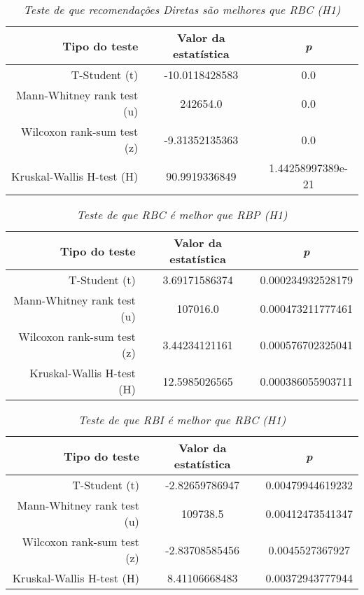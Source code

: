\begin{table}
\centering
\begin{tabular}{|r|c|c|}
    \hline
    \textbf{Tipo do teste} & \textbf{Valor da estatística} & \textbf{\textit{p}} \\
    \hline
T-Student (t) & -10.0118428583 & 0.0 \\
\hline 
Mann-Whitney rank test (u) & 242654.0 & 0.0 \\
\hline 
Wilcoxon rank-sum test (z) & -9.31352135363 & 0.0 \\
\hline 
Kruskal-Wallis H-test (H) & 90.9919336849 & 1.44258997389e-21 \\
\hline 

    \end{tabular}
\caption{\it Teste de que recomendações Diretas são melhores que RBC (H1)}
\end{table}


\begin{table}
\centering
\begin{tabular}{|r|c|c|}
    \hline
    \textbf{Tipo do teste} & \textbf{Valor da estatística} & \textbf{\textit{p}} \\
    \hline
T-Student (t) & 3.69171586374 & 0.000234932528179 \\
\hline 
Mann-Whitney rank test (u) & 107016.0 & 0.000473211777461 \\
\hline 
Wilcoxon rank-sum test (z) & 3.44234121161 & 0.000576702325041 \\
\hline 
Kruskal-Wallis H-test (H) & 12.5985026565 & 0.000386055903711 \\
\hline 

    \end{tabular}
\caption{\it Teste de que RBC é melhor que RBP (H1)}
\end{table}


\begin{table}
\centering
\begin{tabular}{|r|c|c|}
    \hline
    \textbf{Tipo do teste} & \textbf{Valor da estatística} & \textbf{\textit{p}} \\
    \hline
T-Student (t) & -2.82659786947 & 0.00479944619232 \\
\hline 
Mann-Whitney rank test (u) & 109738.5 & 0.00412473541347 \\
\hline 
Wilcoxon rank-sum test (z) & -2.83708585456 & 0.0045527367927 \\
\hline 
Kruskal-Wallis H-test (H) & 8.41106668483 & 0.00372943777944 \\
\hline 

    \end{tabular}
\caption{\it Teste de que RBI é melhor que RBC (H1)}
\end{table}

